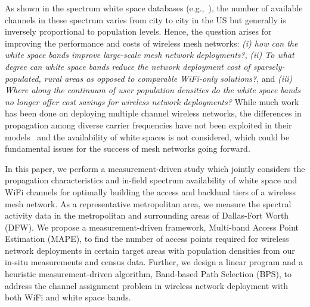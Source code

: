 As shown in the spectrum white space databases (e.g.,~\cite{googledatabase}), the number of available 
channels in these spectrum varies from city to city in the US but generally is inversely proportional to population levels. 
Hence, the question arises for 
improving the performance and costs of wireless mesh networks: {\it (i) how can the 
white space bands improve large-scale mesh network deployments?}, {\it (ii) To what degree can 
white space bands reduce the network deployment cost of sparsely-populated, rural areas as opposed 
to comparable WiFi-only solutions?}, and {\it (iii) Where along the continuum of user population 
densities do the white space bands no longer offer cost savings for wireless network deployments?} 
While much work has been done on deploying multiple channel wireless networks, the differences in 
propagation among diverse carrier frequencies have not been exploited in their models~\cite{tang2005interference, 
doraghinejad2014channel} and the availability of white spaces is not considered, which could be fundamental issues for the success 
of mesh networks going forward. 


In this paper, we perform a measurement-driven study which jointly considers the propagation 
characteristics and in-field spectrum availability of white space and WiFi channels 
for optimally building the access and backhual tiers of a wireless mesh network.
As a representative metropolitan area, we measure the spectral activity data in the metropolitan 
and surrounding areas of Dallas-Fort Worth (DFW).  
We propose a measurement-driven framework, Multi-band Access Point Estimation (MAPE), to find the 
number of access points required for wireless network deployments in certain target areas with population 
densities from our in-situ measurements and census data. 
Further, we design a linear program and a heuristic measurement-driven algorithm, Band-based Path Selection (BPS), 
to address the channel assignment problem in wireless network deployment with both WiFi and white space bands. 


